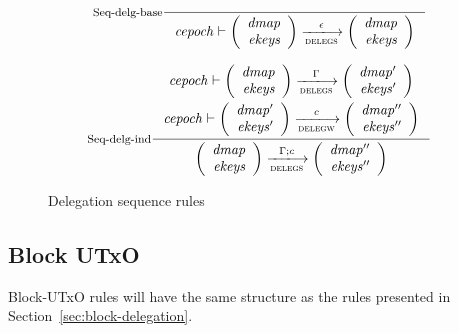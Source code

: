 \begin{figure}
  \begin{equation}
    \inference[Seq-delg-base]
    {}
    { \var{cepoch} \vdash \left(
        \begin{array}{r}
          \var{dmap}\\
          \var{ekeys}
        \end{array}
      \right)
        \trans{delegs}{\epsilon}
      \left(
        \begin{array}{r}
          \var{dmap}\\
          \var{ekeys}
        \end{array}
      \right)
    }
    \label{eq:rule:sequence-delegation-base}
  \end{equation}

  \begin{equation}
    \inference[Seq-delg-ind]
    { \var{cepoch} \vdash
      {\left(
        \begin{array}{r}
          \var{dmap}\\
          \var{ekeys}
        \end{array}
      \right)}
      \trans{delegs}{\Gamma}
      {\left(
        \begin{array}{r}
          \var{dmap'}\\
          \var{ekeys'}
        \end{array}
      \right)}
    \\ ~ \\
    \var{cepoch} \vdash
    {\left(
        \begin{array}{r}
          \var{dmap'}\\
          \var{ekeys'}
        \end{array}
      \right)}
      \trans{delegw}{c}
      {\left(
        \begin{array}{r}
          \var{dmap''}\\
          \var{ekeys''}
        \end{array}
      \right)}
    }
    { \left(
        \begin{array}{r}
          \var{dmap}\\
          \var{ekeys}
        \end{array}
      \right)
      \trans{delegs}{\Gamma; c}
      \left(
        \begin{array}{r}
          \var{dmap''}\\
          \var{ekeys''}
        \end{array}
      \right)
    }
    \label{eq:rule:sequence-delegation-inductive}
  \end{equation}
  \caption{Delegation sequence rules}
  \label{fig:delegation-sequence-rules}
\end{figure}

\subsection{Block UTxO}
\label{sec:block-utxo}


\begin{todo}
  Block-UTxO rules will have the same structure as the rules presented in
  Section~\ref{sec:block-delegation}.
\end{todo}
